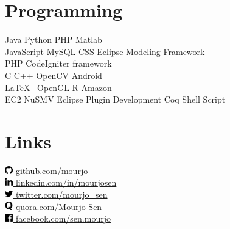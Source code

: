 \documentclass[a4paper, bookmarks=false,hidelinks]{ms-resume} %
\begin{document}
\begin{minipage}[t]{0.27\textwidth}

\section{Programming}
Java \textbullet{} Python \textbullet{} PHP \textbullet{} Matlab \textbullet{}\\ 
JavaScript \textbullet{} MySQL \textbullet{} CSS \textbullet{} Eclipse Modeling Framework \textbullet{}\\
PHP CodeIgniter framework \\
C \textbullet{} C++ \textbullet{} OpenCV \textbullet{} Android \textbullet{}\\ 
\LaTeX\ \textbullet{} OpenGL \textbullet{} R \textbullet{} Amazon\\
EC2 \textbullet{} NuSMV \textbullet{} Eclipse Plugin Development \textbullet{} Coq \textbullet{} Shell Script 

\sectionspace %


\section{Links} 

\href{https://github.com/mourjo}{\includegraphics[height=0.35cm]{icons/icon_github_print} github.com/mourjo} \\
\href{http://in.linkedin.com/in/mourjosen}{\includegraphics[height=0.35cm]{icons/icon_linkedin_print} linkedin.com/in/mourjosen} \\
\href{https://twitter.com/mourjo_sen}{\includegraphics[height=0.35cm] {icons/icon_twitter_print} twitter.com/mourjo\_sen} \\
\href{http://www.quora.com/Mourjo-Sen}{\includegraphics[height=0.35cm]{icons/icon_quora_print} quora.com/Mourjo-Sen}\\
\href{https://www.facebook.com/sen.mourjo}{\includegraphics[height=0.35cm]{icons/facebook_logo_print} facebook.com/sen.mourjo}

\sectionspace %

\end{minipage} %
\end{document}

